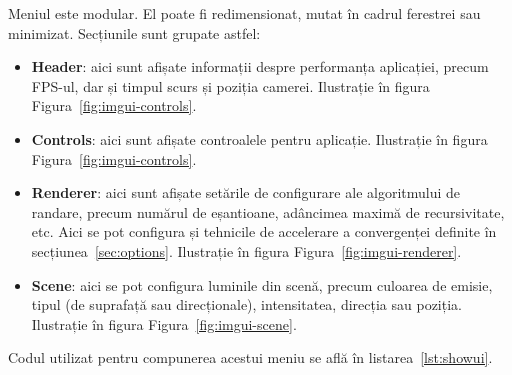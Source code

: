 \documentclass[12pt,a4paper]{report}
\numberwithin{equation}{section} %
\begin{document}
Meniul este modular. El poate fi redimensionat, mutat în cadrul ferestrei sau minimizat.
Secțiunile sunt grupate astfel:
\begin{itemize}
	\item \textbf{Header}: aici sunt afișate informații despre performanța aplicației,
	      precum FPS-ul, dar și timpul scurs și poziția camerei. Ilustrație în figura Figura~\ref{fig:imgui-controls}.
	\item \textbf{Controls}: aici sunt afișate controalele pentru aplicație.
	      Ilustrație în figura Figura~\ref{fig:imgui-controls}.
	\item \textbf{Renderer}: aici sunt afișate setările de configurare ale algoritmului
	      de randare, precum numărul de eșantioane, adâncimea maximă de recursivitate, etc.
	      Aici se pot configura și tehnicile de accelerare a convergenței definite în secțiunea~\ref{sec:options}.
	      Ilustrație în figura Figura~\ref{fig:imgui-renderer}.
	\item \textbf{Scene}: aici se pot configura luminile din scenă, precum culoarea de emisie,
	      tipul (de suprafață sau direcționale), intensitatea, direcția sau poziția.
	      Ilustrație în figura Figura~\ref{fig:imgui-scene}.
\end{itemize}

Codul utilizat pentru compunerea acestui meniu se află în listarea~\ref{lst:showui}.
\end{document}
